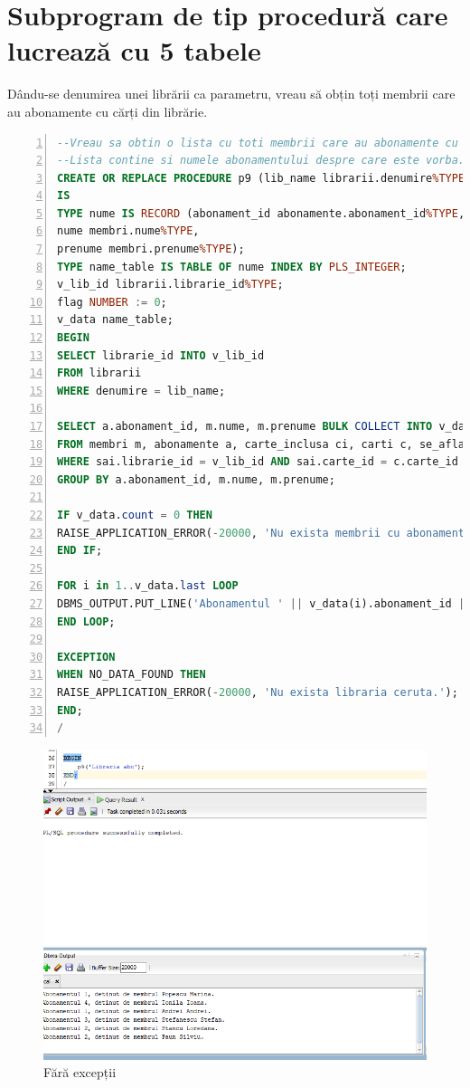 \documentclass[12pt]{article}
\begin{document}
\section{Subprogram de tip procedură care lucrează cu 5 tabele}
Dându-se denumirea unei librării ca parametru, vreau să obțin toți membrii care au abonamente cu cărți din librărie.\\
\begin{lstlisting}[language=SQL,
	showspaces=false,
	basicstyle=\ttfamily,
	numbers=left,
	numberstyle=\tiny,
	breaklines=true,
	commentstyle=\color{gray}]
--Vreau sa obtin o lista cu toti membrii care au abonamente cu carti din libraria data in procedura.
--Lista contine si numele abonamentului despre care este vorba.
CREATE OR REPLACE PROCEDURE p9 (lib_name librarii.denumire%TYPE)
IS
TYPE nume IS RECORD (abonament_id abonamente.abonament_id%TYPE,
nume membri.nume%TYPE,
prenume membri.prenume%TYPE);
TYPE name_table IS TABLE OF nume INDEX BY PLS_INTEGER;
v_lib_id librarii.librarie_id%TYPE;
flag NUMBER := 0;
v_data name_table;
BEGIN
SELECT librarie_id INTO v_lib_id
FROM librarii
WHERE denumire = lib_name;

SELECT a.abonament_id, m.nume, m.prenume BULK COLLECT INTO v_data
FROM membri m, abonamente a, carte_inclusa ci, carti c, se_afla_in sai
WHERE sai.librarie_id = v_lib_id AND sai.carte_id = c.carte_id AND c.carte_id = ci.carte_id AND ci.abonament_id = a.abonament_id AND m.abonament_id = a.abonament_id
GROUP BY a.abonament_id, m.nume, m.prenume;

IF v_data.count = 0 THEN
RAISE_APPLICATION_ERROR(-20000, 'Nu exista membrii cu abonamente care includ carti in libraria ceruta.');
END IF;

FOR i in 1..v_data.last LOOP
DBMS_OUTPUT.PUT_LINE('Abonamentul ' || v_data(i).abonament_id || ', detinut de membrul ' || v_data(i).nume || ' ' || v_data(i).prenume || '.');
END LOOP;

EXCEPTION
WHEN NO_DATA_FOUND THEN
RAISE_APPLICATION_ERROR(-20000, 'Nu exista libraria ceruta.');
END;
/
\end{lstlisting}
\begin{figure}[!htb]
\includegraphics[max width=\linewidth]{imgs/ex9_1.png}
\caption{Fără excepții}
\label{fig:ex9_1}
\end{figure}
\end{document}
